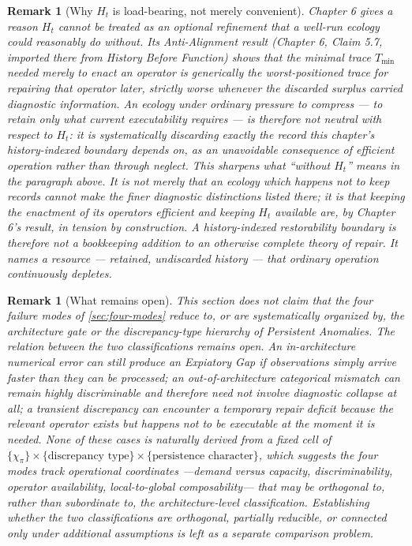 \documentclass[12pt]{report}
\newtheorem{remark}[definition]{Remark}
\begin{document}
\begin{remark}[Why $H_t$ is load-bearing, not merely convenient]
\label{rem:antialign-bridge}
Chapter 6 gives a reason $H_t$ cannot be treated as an optional refinement
that a well-run ecology could reasonably do without. Its Anti-Alignment
result (Chapter 6, Claim 5.7, imported there from \emph{History Before
Function}) shows that the minimal trace $T_{\min}$ needed merely to
\emph{enact} an operator is generically the worst-positioned trace for
\emph{repairing} that operator later, strictly worse whenever the
discarded surplus carried diagnostic information. An ecology under
ordinary pressure to compress --- to retain only what current
executability requires --- is therefore not neutral with respect to
$H_t$: it is systematically discarding exactly the record this chapter's
history-indexed boundary depends on, as an unavoidable consequence of
efficient operation rather than through neglect. This sharpens what
``without $H_t$'' means in the paragraph above. It is not merely that an
ecology which happens not to keep records cannot make the finer
diagnostic distinctions listed there; it is that keeping the enactment of
its operators efficient and keeping $H_t$ available are, by Chapter 6's
result, in tension by construction. A history-indexed restorability
boundary is therefore not a bookkeeping addition to an otherwise complete
theory of repair. It names a resource --- retained, undiscarded history
--- that ordinary operation continuously depletes.
\end{remark}

\begin{remark}[What remains open]
\label{rem:open-relation}
This section does not claim that the four failure modes of
\cref{sec:four-modes} reduce to, or are systematically organized by, the
architecture gate or the discrepancy-type hierarchy of
\emph{Persistent Anomalies}. The relation between the two classifications
remains open. An in-architecture numerical error can still produce an
Expiatory Gap if observations simply arrive faster than they can be
processed; an out-of-architecture categorical mismatch can remain highly
discriminable and therefore need not involve diagnostic collapse at all; a
transient discrepancy can encounter a temporary repair deficit because the
relevant operator exists but happens not to be executable at the moment
it is needed. None of these cases is naturally derived from a fixed cell
of $\{\chi_\pi\} \times \{\text{discrepancy type}\} \times \{\text{persistence
character}\}$, which suggests the four modes track operational coordinates
---demand versus capacity, discriminability, operator availability,
local-to-global composability--- that may be orthogonal to, rather than
subordinate to, the architecture-level classification. Establishing
whether the two classifications are orthogonal, partially reducible, or
connected only under additional assumptions is left as a separate
comparison problem.
\end{remark}
\end{document}
